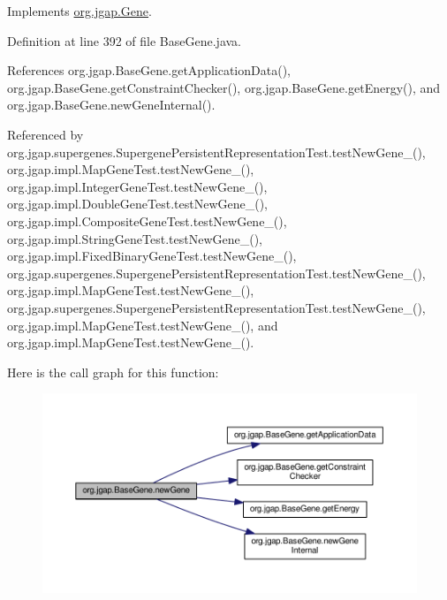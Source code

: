 Implements \hyperlink{interfaceorg_1_1jgap_1_1_gene_ae4ddccb7bf569c0ed6cdc19def590964}{org.\-jgap.\-Gene}.



Definition at line 392 of file Base\-Gene.\-java.



References org.\-jgap.\-Base\-Gene.\-get\-Application\-Data(), org.\-jgap.\-Base\-Gene.\-get\-Constraint\-Checker(), org.\-jgap.\-Base\-Gene.\-get\-Energy(), and org.\-jgap.\-Base\-Gene.\-new\-Gene\-Internal().



Referenced by org.\-jgap.\-supergenes.\-Supergene\-Persistent\-Representation\-Test.\-test\-New\-Gene\-\_(), org.\-jgap.\-impl.\-Map\-Gene\-Test.\-test\-New\-Gene\-\_(), org.\-jgap.\-impl.\-Integer\-Gene\-Test.\-test\-New\-Gene\-\_(), org.\-jgap.\-impl.\-Double\-Gene\-Test.\-test\-New\-Gene\-\_(), org.\-jgap.\-impl.\-Composite\-Gene\-Test.\-test\-New\-Gene\-\_(), org.\-jgap.\-impl.\-String\-Gene\-Test.\-test\-New\-Gene\-\_(), org.\-jgap.\-impl.\-Fixed\-Binary\-Gene\-Test.\-test\-New\-Gene\-\_(), org.\-jgap.\-supergenes.\-Supergene\-Persistent\-Representation\-Test.\-test\-New\-Gene\-\_(), org.\-jgap.\-impl.\-Map\-Gene\-Test.\-test\-New\-Gene\-\_(), org.\-jgap.\-supergenes.\-Supergene\-Persistent\-Representation\-Test.\-test\-New\-Gene\-\_(), org.\-jgap.\-impl.\-Map\-Gene\-Test.\-test\-New\-Gene\-\_(), and org.\-jgap.\-impl.\-Map\-Gene\-Test.\-test\-New\-Gene\-\_().



Here is the call graph for this function\-:
\nopagebreak
\begin{figure}[H]
\begin{center}
\leavevmode
\includegraphics[width=350pt]{classorg_1_1jgap_1_1_base_gene_a40f8f3d249145ad028892cd706ba9dae_cgraph}
\end{center}
\end{figure}


